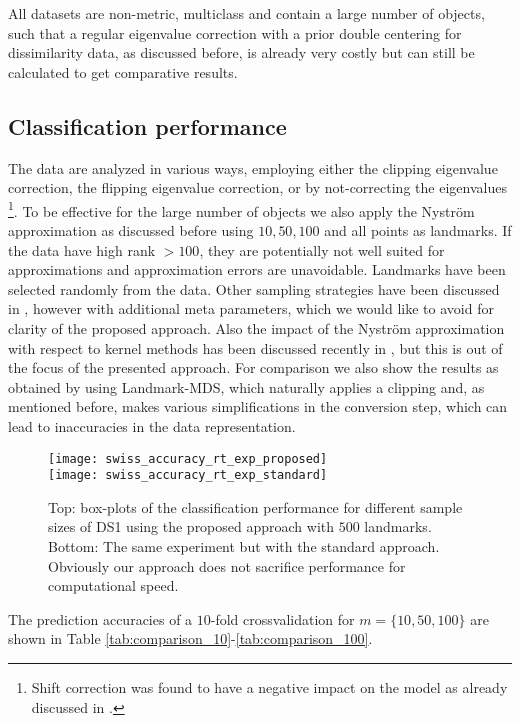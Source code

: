 \documentclass[twoside,11pt]{article}
\begin{document}
All datasets are non-metric, multiclass and contain a large number of objects, such that a regular eigenvalue correction
with a prior double centering for dissimilarity data, as discussed before, is already very costly but can still be calculated to get comparative results. 

\subsection{Classification performance}
The data are analyzed in various ways, employing either the clipping eigenvalue correction, the flipping eigenvalue correction, or by not-correcting the eigenvalues
\footnote{
Shift correction was found to have a negative impact on the model as already discussed in \cite{DBLP:journals/jmlr/ChenGGRC09}.}. 
To be effective for the large number of objects we also apply the Nystr\"om approximation as discussed
before using $10, 50, 100$ and all points as landmarks. If the data have high rank $>100$, they are potentially not well suited for approximations
and approximation errors are unavoidable.
Landmarks have been selected randomly from the data. Other sampling strategies have been discussed in \cite{DBLP:journals/jmlr/FarahatGK11,DBLP:journals/tnn/ZhangK10a,DBLP:conf/icml/SiHD14}, 
however with additional meta parameters, which we would like to avoid for clarity of the proposed approach. Also the impact of the Nystr\"om approximation with respect
to kernel methods has been discussed recently in \cite{DBLP:journals/jmlr/CortesMT10}, 
but this is out of the focus of the presented approach.
For comparison we also show the results as obtained by using Landmark-MDS, which naturally applies a clipping and, as mentioned before,
makes various simplifications in the conversion step, which can lead to inaccuracies in the data representation.
\begin{figure}[p]
	\centering
	\texttt{[image: swiss\_accuracy\_rt\_exp\_proposed]}\\\texttt{[image: swiss\_accuracy\_rt\_exp\_standard]}\caption{Top: box-plots of the classification performance for different sample sizes of DS1 using the proposed approach with $500$ landmarks.
         Bottom: The same experiment but with the standard approach. Obviously our approach does not sacrifice performance for computational speed.}
         \label{fig:diss_rt_swiss}
\end{figure}
The prediction accuracies of a $10$-fold crossvalidation for $m=\{10,50,100\}$ are shown in Table \ref{tab:comparison_10}-\ref{tab:comparison_100}.
\end{document}

